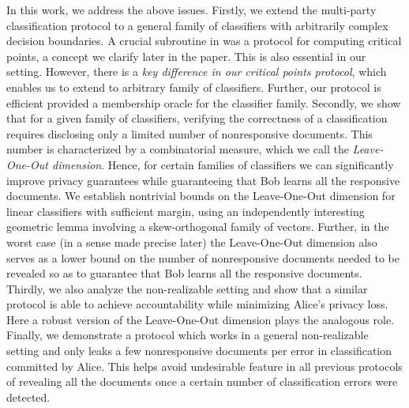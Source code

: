 In this work, we address the above issues. 
Firstly, we extend the multi-party classification protocol to a general family of classifiers with arbitrarily complex decision boundaries.
A crucial subroutine in \citet{dong2022classification} was a protocol for computing critical points, a concept we clarify later in the paper. This is also essential in our setting.  
However, there is a \emph{key difference in our critical points protocol}, which enables us to extend to arbitrary family of classifiers.
Further, our protocol is efficient provided a membership oracle for the classifier family.
Secondly, we show that for a given family of classifiers, verifying the correctness of a classification requires disclosing only a limited number of nonresponsive documents. This number is characterized by a combinatorial measure, which we call the \emph{Leave-One-Out dimension}.
Hence, for certain families of classifiers we can significantly improve privacy guarantees while guaranteeing that Bob learns all the responsive documents. 
We establish nontrivial bounds on the Leave-One-Out dimension for linear classifiers with sufficient margin, using an independently interesting geometric lemma involving a skew-orthogonal family of vectors.
Further, in the worst case (in a sense made precise later) the Leave-One-Out dimension also serves as a lower bound on the number of nonresponsive documents needed to be revealed so as to guarantee that Bob learns all the responsive documents.
Thirdly, we also analyze the non-realizable setting and show that a similar protocol is able to achieve accountability while minimizing Alice's privacy loss.
Here a robust version of the Leave-One-Out dimension plays the analogous role.
Finally, we demonstrate a protocol which works in a general non-realizable setting and only leaks a few nonresponsive documents per error in classification committed by Alice. This helps avoid undesirable feature in all previous protocols of revealing all the documents once a certain number of classification errors were detected.

